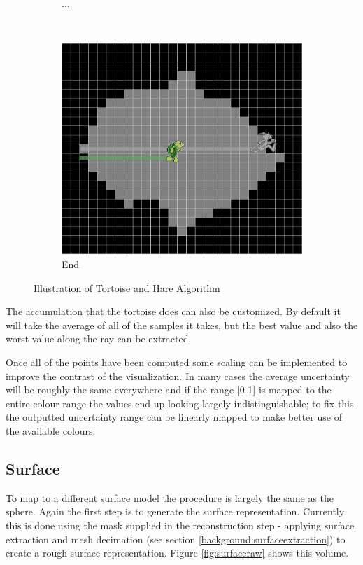 \begin{figure}[H]
\begin{subfigure}[b]{0.32\textwidth}
    \caption*{...}
    \label{fig:tortoiseandhare2}
  \end{subfigure}%
  ~ %
  \begin{subfigure}[b]{0.32\textwidth}
    \includegraphics[width=\textwidth]{images/surface/tortoise_and_hare_3.png}
    \caption*{End}
    \label{fig:tortoiseandhare3}  
  \end{subfigure}
  \caption{Illustration of Tortoise and Hare Algorithm}\label{fig:tortoiseandhareexample}
\end{figure}

The accumulation that the tortoise does can also be customized. By default it will take the average of all of the samples it takes, but the best value and also the worst value along the ray can be extracted.

Once all of the points have been computed some scaling can be implemented to improve the contrast of the visualization. In many cases the average uncertainty will be roughly the same everywhere and if the range [0-1] is mapped to the entire colour range the values end up looking largely indistinguishable; to fix this the outputted uncertainty range can be linearly mapped to make better use of the available colours.

\clearpage
\subsection{Surface}
To map to a different surface model the procedure is largely the same as the sphere. Again the first step is to generate the surface representation. Currently this is done using the mask supplied in the reconstruction step - applying surface extraction and mesh decimation (see section \ref{background:surfaceextraction}) to create a rough surface representation. Figure \ref{fig:surfaceraw} shows this volume.

